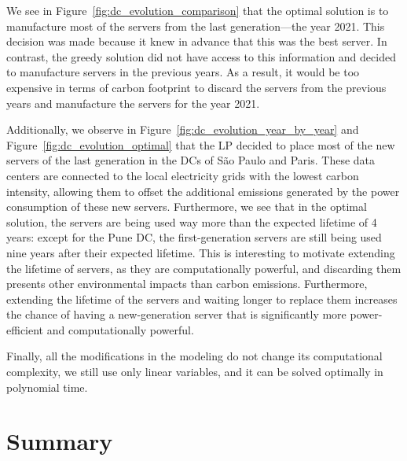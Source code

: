 We see in Figure~\ref{fig:dc_evolution_comparison} that the optimal solution is to manufacture most of the servers from the last generation---the year 2021. This decision was made because it knew in advance that this was the best server. In contrast, the greedy solution did not have access to this information and decided to manufacture servers in the previous years. As a result, it would be too expensive in terms of carbon footprint to discard the servers from the previous years and manufacture the servers for the year 2021.

Additionally, we observe in Figure~\ref{fig:dc_evolution_year_by_year} and Figure~\ref{fig:dc_evolution_optimal} that the LP decided to place most of the new servers of the last generation in the DCs of São Paulo and Paris. These data centers are connected to the local electricity grids with the lowest carbon intensity, allowing them to offset the additional emissions generated by the power consumption of these new servers. Furthermore, we see that in the optimal solution, the servers are being used way more than the expected lifetime of 4 years: except for the Pune DC, the first-generation servers are still being used nine years after their expected lifetime. This is interesting to motivate extending the lifetime of servers, as they are computationally powerful, and discarding them presents other environmental impacts than carbon emissions. Furthermore, extending the lifetime of the servers and waiting longer to replace them increases the chance of having a new-generation server that is significantly more power-efficient and computationally powerful. 

Finally, all the modifications in the modeling do not change its computational complexity, we still use only linear variables, and it can be solved optimally in polynomial time.

\section{Summary}

\label{sec:long_term_conclusion}

